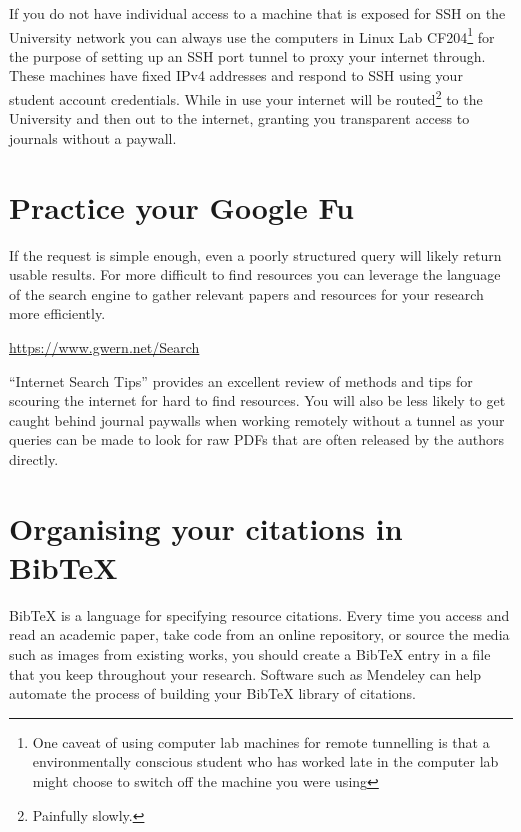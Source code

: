 If you do not have individual access to a machine that is exposed for SSH on the University network you can always use the computers in Linux Lab CF204\footnote{One caveat of using computer lab machines for remote tunnelling is that a environmentally conscious student who has worked late in the computer lab might choose to switch off the machine you were using\edots} for the purpose of setting up an SSH port tunnel to proxy your internet through.
These machines have fixed IPv4 addresses and respond to SSH using your student account credentials.
While in use your internet will be routed\footnote{Painfully slowly.} to the University and then out to the internet, granting you transparent access to journals without a paywall.


	\section{Practice your Google Fu}
		\label{sec:google_fu}

If the request is simple enough, even a poorly structured query will likely return usable results.
For more difficult to find resources you can leverage the language of the search engine to gather relevant papers and resources for your research more efficiently. 
		
		\begin{center}
		{\small \url{https://www.gwern.net/Search}}
		\end{center}
		
``Internet Search Tips'' \cite{gwern} provides an excellent review of methods and tips for scouring the internet for hard to find resources.
You will also be less likely to get caught behind journal paywalls when working remotely without a tunnel as your queries can be made to look for raw PDFs that are often released by the authors directly.


	\section{Organising your citations in Bib\TeX{}}
		\label{sec:resources_bibtex}
	
Bib\TeX{} is a language for specifying resource citations.
Every time you access and read an academic paper, take code from an online repository, or source the media such as images from existing works, you should create a Bib\TeX{} entry in a file that you keep throughout your research.
Software such as Mendeley \cite{mendeley} can help automate the process of building your Bib\TeX{} library of citations. 
		
